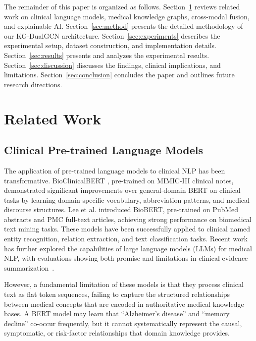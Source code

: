 \documentclass[11pt,onecolumn,a4paper]{article}
\begin{document}
The remainder of this paper is organized as follows. Section~\ref{sec:related} reviews related work on clinical language models, medical knowledge graphs, cross-modal fusion, and explainable AI. Section~\ref{sec:method} presents the detailed methodology of our KG-DualGCN architecture. Section~\ref{sec:experiments} describes the experimental setup, dataset construction, and implementation details. Section~\ref{sec:results} presents and analyzes the experimental results. Section~\ref{sec:discussion} discusses the findings, clinical implications, and limitations. Section~\ref{sec:conclusion} concludes the paper and outlines future research directions.

\section{Related Work}
\label{sec:related}

\subsection{Clinical Pre-trained Language Models}

The application of pre-trained language models to clinical NLP has been transformative. BioClinicalBERT \cite{alsentzer2019}, pre-trained on MIMIC-III clinical notes, demonstrated significant improvements over general-domain BERT on clinical tasks by learning domain-specific vocabulary, abbreviation patterns, and medical discourse structures. Lee et al. \cite{lee2020biobert} introduced BioBERT, pre-trained on PubMed abstracts and PMC full-text articles, achieving strong performance on biomedical text mining tasks. These models have been successfully applied to clinical named entity recognition, relation extraction, and text classification tasks. Recent work has further explored the capabilities of large language models (LLMs) for medical NLP, with evaluations showing both promise and limitations in clinical evidence summarization~\cite{tang2023evaluating}.

However, a fundamental limitation of these models is that they process clinical text as flat token sequences, failing to capture the structured relationships between medical concepts that are encoded in authoritative medical knowledge bases. A BERT model may learn that ``Alzheimer's disease'' and ``memory decline'' co-occur frequently, but it cannot systematically represent the causal, symptomatic, or risk-factor relationships that domain knowledge provides.
\end{document}
